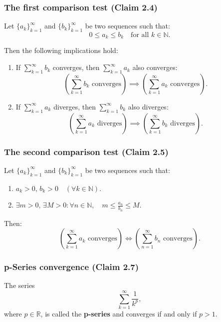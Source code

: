 \subsubsection{The first comparison test (Claim 2.4)}

Let $\{a_k\}_{k=1}^\infty$ and $\{b_k\}_{k=1}^\infty$ be two sequences such that:
\[
    0 \leq a_k \leq b_k \quad \text{for all } k \in \mathbb{N}.
\]

Then the following implications hold:
\begin{enumerate}[label=(\arabic*)]
    \item If $\sum_{k=1}^\infty b_k$ converges, then $\sum_{k=1}^\infty a_k$ also converges:
    \[
        \left( \sum_{k=1}^\infty b_k \text{ converges} \right)
        \implies
        \left( \sum_{k=1}^\infty a_k \text{ converges} \right).
    \]

    \item If $\sum_{k=1}^\infty a_k$ diverges, then $\sum_{k=1}^\infty b_k$ also diverges:
    \[
        \left( \sum_{k=1}^\infty a_k \text{ diverges} \right)
        \implies
        \left( \sum_{k=1}^\infty b_k \text{ diverges} \right).
    \]
\end{enumerate}

\subsubsection{The second comparison test (Claim 2.5)}


Let $\{a_k\}_{k=1}^\infty$ and $\{b_k\}_{k=1}^\infty$ be two sequences such that:
\begin{enumerate}[label=(\alph*)]
    \item $a_k > 0, \, b_k > 0 \quad (\forall k \in \mathbb{N})$.
    \item $\exists m > 0, \, \exists M > 0 : \forall n \in \mathbb{N}, \quad m \leq \frac{a_n}{b_n} \leq M$.
\end{enumerate}

Then:
\[
    \left( \sum_{k=1}^\infty a_k \text{ converges} \right)
    \iff
    \left( \sum_{n=1}^\infty b_n \text{ converges} \right).
\]

\subsubsection{p-Series convergence (Claim 2.7)}


The series
\[
    \sum_{k=1}^\infty \frac{1}{k^p},
\]
where $p \in \mathbb{R}$, is called the \textbf{p-series} and converges if and only if $p > 1$.


